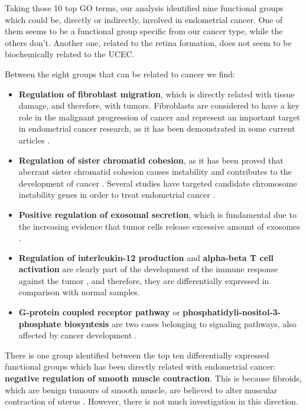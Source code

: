 \documentclass[9pt,twocolumn,twoside]{gsajnl}
\begin{document}
Taking those 10 top GO terms, our analysis identified nine functional groups which could be, directly or indirectly, involved in endometrial cancer. One of them seems to be a functional group specific from our cancer type, while the others don't. Another one, related to the retina formation, does not seem to be biochemically related to the UCEC. 

Between the eight groups that can be related to cancer we find:
\begin{itemize}
  \item \textbf{Regulation of fibroblast migration}, which is directly related with tissue damage, and therefore, with tumors. Fibroblasts are considered to have a key role in the malignant progression of cancer and represent an important target in endometrial cancer research, as it has been demonstrated in some current articles \citep{Subramaniam2013, Teng2016, Turner2010}.
  \item \textbf{Regulation of sister chromatid cohesion}, as it has been proved that aberrant sister chromatid cohesion causes instability and contributes to the development of cancer \citep{LeGallo2012}. Several studies have targeted candidate chromosome instability genes in order to treat endometrial cancer \citep{Price2013}.
  \item \textbf{Positive regulation of exosomal secretion}, which is fundamental due to the increasing evidence that tumor cells release excessive amount of exosomes \citep{Zhang2015}.
  \item \textbf{Regulation of interleukin-12 production} and \textbf{alpha-beta T cell activation} are clearly part of the development of the immune response against the tumor \citep{Colombo2002, Martin-Orozco2009}, and therefore, they are differentially expressed in comparison with normal samples. 
  \item \textbf{G-protein coupled receptor pathway} or \textbf{phosphatidyli-nositol-3-phosphate biosyntesis} are two cases belonging to signaling pathways, also affected by cancer development \citep{Li2005, Wang2006}.
\end{itemize}

There is one group identified between the top ten differentially expressed functional groups which has been directly related with endometrial cancer: \textbf{negative regulation of smooth muscle contraction}. This is because fibroids, which are benign tumours of smooth muscle, are believed to alter muscular contraction of uterus \citep{GeorgetownUniversityHospital}. However, there is not much investigation in this direction.
\end{document}
